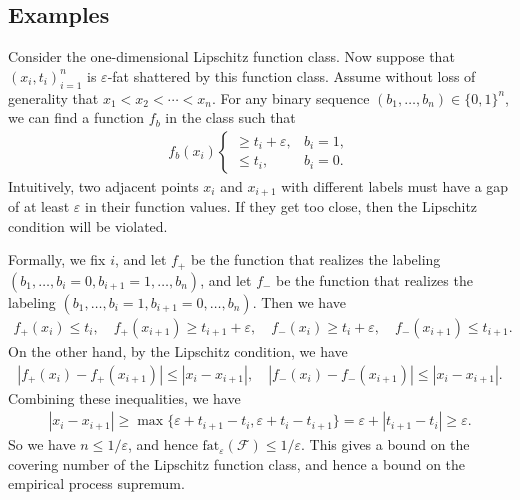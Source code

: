 \documentclass[11pt,letterpaper]{article}
\numberwithin{theorem}{lecture}
\numberwithin{proposition}{lecture}
\numberwithin{lemma}{lecture}
\numberwithin{claim}{lecture}
\numberwithin{corollary}{lecture}
\numberwithin{definition}{lecture}
\numberwithin{conjecture}{lecture}
\numberwithin{remark}{lecture}
\numberwithin{example}{lecture}
\numberwithin{equation}{lecture}
\begin{document}
\subsection{Examples}
Consider the one-dimensional Lipschitz function class. Now suppose that $(x_i, t_i)_{i = 1}^n$ is $\varepsilon$-fat shattered by this function class. Assume without loss of generality that $x_1 < x_2 < \cdots < x_n$. For any binary sequence $(b_1, \ldots, b_n) \in \{0, 1\}^n$, we can find a function $f_b$ in the class such that
\begin{align*}
  f_b (x_i) \begin{cases}
    \geq t_i + \varepsilon, & b_i = 1,\\
    \leq t_i, & b_i = 0.
  \end{cases}
\end{align*}
Intuitively, two adjacent points $x_i$ and $x_{i + 1}$ with different labels must have a gap of at least $\varepsilon$ in their function values. If they get too close, then the Lipschitz condition will be violated.

Formally, we fix $i$, and let $f_+$ be the function that realizes the labeling $(b_1, \ldots, b_i = 0, b_{i + 1} = 1, \ldots, b_n)$, and let $f_-$ be the function that realizes the labeling $(b_1, \ldots, b_i = 1, b_{i + 1} = 0, \ldots, b_n)$. Then we have
\begin{align*}
  f_+ (x_i) \leq t_i, \quad f_+ (x_{i + 1}) \geq t_{i + 1} + \varepsilon, \quad f_- (x_i) \geq t_i + \varepsilon, \quad f_- (x_{i + 1}) \leq t_{i + 1}.
\end{align*}
On the other hand, by the Lipschitz condition, we have
\begin{align*}
  |f_+ (x_i) - f_+ (x_{i + 1})| \leq |x_i - x_{i + 1}|, \quad |f_- (x_i) - f_- (x_{i + 1})| \leq |x_i - x_{i + 1}|.
\end{align*}
Combining these inequalities, we have
\begin{align*}
  |x_i - x_{i + 1}| \geq \max \Big\{ \varepsilon + t_{i + 1} - t_i, \varepsilon + t_i - t_{i + 1} \Big\} = \varepsilon + |t_{i + 1} - t_i| \geq \varepsilon.
\end{align*}
So we have $n \leq 1 / \varepsilon$, and hence $\text{fat}_\varepsilon (\mathcal{F}) \leq 1 / \varepsilon$. This gives a bound on the covering number of the Lipschitz function class, and hence a bound on the empirical process supremum.
\end{document}
